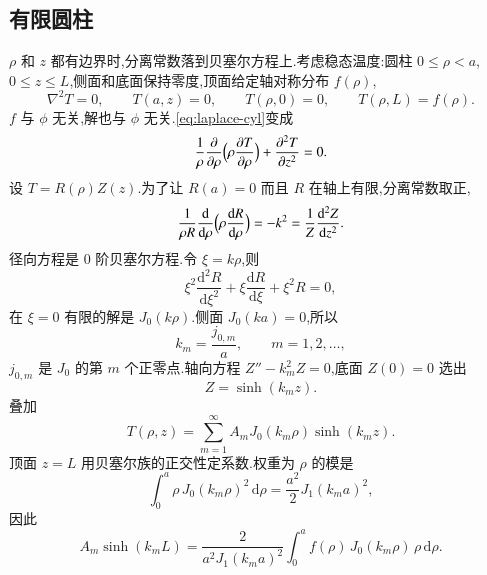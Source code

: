 \subsection{有限圆柱}
$\rho$ 和 $z$ 都有边界时,分离常数落到贝塞尔方程上.考虑稳态温度:圆柱 $0\leq\rho<a$, $0\leq z\leq L$,侧面和底面保持零度,顶面给定轴对称分布 $f(\rho)$,
\begin{equation}
  \nabla^2 T=0,
  \qquad
  T(a,z)=0,
  \qquad
  T(\rho,0)=0,
  \qquad
  T(\rho,L)=f(\rho).
\end{equation}
$f$ 与 $\phi$ 无关,解也与 $\phi$ 无关.\eqref{eq:laplace-cyl}变成
\begin{equation}
  \frac{1}{\rho}\frac{\partial}{\partial\rho}
    \Bigl(\rho\frac{\partial T}{\partial\rho}\Bigr)
  +\frac{\partial^2 T}{\partial z^2}=0.
\end{equation}
设 $T=R(\rho)Z(z)$.为了让 $R(a)=0$ 而且 $R$ 在轴上有限,分离常数取正,
\begin{equation}
  \frac{1}{\rho R}\frac{\mathrm{d}}{\mathrm{d}\rho}
    \Bigl(\rho\frac{\mathrm{d}R}{\mathrm{d}\rho}\Bigr)
  =-k^2
  =\frac{1}{Z}\frac{\mathrm{d}^2 Z}{\mathrm{d}z^2}.
\end{equation}
径向方程是 $0$ 阶贝塞尔方程.令 $\xi=k\rho$,则
\begin{equation}
  \xi^2\frac{\mathrm{d}^2 R}{\mathrm{d}\xi^2}
  +\xi\frac{\mathrm{d}R}{\mathrm{d}\xi}
  +\xi^2 R=0,
\end{equation}
在 $\xi=0$ 有限的解是 $J_0(k\rho)$.侧面 $J_0(ka)=0$,所以
\begin{equation}
  k_m=\frac{j_{0,m}}{a},
  \qquad m=1,2,\ldots,
\end{equation}
$j_{0,m}$ 是 $J_0$ 的第 $m$ 个正零点.轴向方程 $Z''-k_m^2 Z=0$,底面 $Z(0)=0$ 选出
\begin{equation}
  Z=\sinh(k_m z).
\end{equation}
叠加
\begin{equation}
  T(\rho,z)
  =\sum_{m=1}^{\infty} A_m J_0(k_m\rho)\sinh(k_m z).
\end{equation}
顶面 $z=L$ 用贝塞尔族的正交性定系数.权重为 $\rho$ 的模是
\begin{equation}
  \int_0^{a}\rho\, J_0(k_m\rho)^2\,\mathrm{d}\rho
  =\frac{a^2}{2}J_1(k_m a)^2,
\end{equation}
因此
\begin{equation}
  A_m\sinh(k_m L)
  =\frac{2}{a^2 J_1(k_m a)^2}
    \int_0^{a} f(\rho)\, J_0(k_m\rho)\,\rho\,\mathrm{d}\rho.
  \label{eq:cylinder-coeff}
\end{equation}

